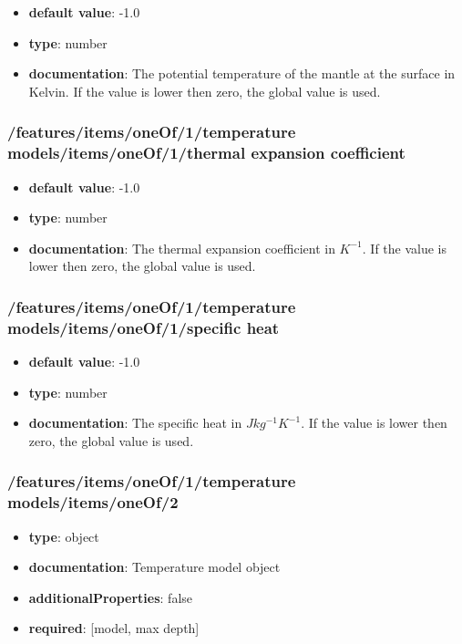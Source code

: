 \begin{itemize}\item {\bf default value}: -1.0
\item {\bf type}: number
\item {\bf documentation}: The potential temperature of the mantle at the surface in Kelvin. If the value is lower then zero, the global value is used.
\end{itemize}\subsubsection{/features/items/oneOf/1/temperature models/items/oneOf/1/thermal expansion coefficient}
\begin{itemize}\item {\bf default value}: -1.0
\item {\bf type}: number
\item {\bf documentation}: The thermal expansion coefficient in $K^{-1}$. If the value is lower then zero, the global value is used.
\end{itemize}\subsubsection{/features/items/oneOf/1/temperature models/items/oneOf/1/specific heat}
\begin{itemize}\item {\bf default value}: -1.0
\item {\bf type}: number
\item {\bf documentation}: The specific heat in $J kg^{-1} K^{-1}$. If the value is lower then zero, the global value is used.
\end{itemize}\subsubsection{/features/items/oneOf/1/temperature models/items/oneOf/2}
\begin{itemize}\item {\bf type}: object
\item {\bf documentation}: Temperature model object
\item {\bf additionalProperties}: false
\item {\bf required}: [model, max depth]\end{itemize}
